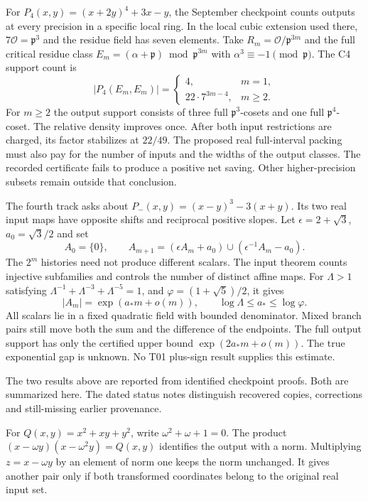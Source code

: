 For $P_4(x,y)=(x+2y)^4+3x-y$, the September checkpoint counts outputs at every precision in a specific local ring. In the local cubic extension used there, $7\mathcal O=\mathfrak p^3$ and the residue field has seven elements. Take $R_m=\mathcal O/\mathfrak p^{3m}$ and the full critical residue class $E_m=(\alpha+\mathfrak p)\bmod\mathfrak p^{3m}$ with $\alpha^3\equiv-1\pmod{\mathfrak p}$. The C4 support count is
\[
 |P_4(E_m,E_m)|=
 \begin{cases}
  4,&m=1,\\
  22\cdot7^{3m-4},&m\ge2.
 \end{cases}
\]
For $m\ge2$ the output support consists of three full $\mathfrak p^3$-cosets and one full $\mathfrak p^4$-coset. The relative density improves once. After both input restrictions are charged, its factor stabilizes at $22/49$. The proposed real full-interval packing must also pay for the number of inputs and the widths of the output classes. The recorded certificate fails to produce a positive net saving. Other higher-precision subsets remain outside that conclusion. 

The fourth track asks about $P_-(x,y)=(x-y)^3-3(x+y)$. Its two real input maps have opposite shifts and reciprocal positive slopes. Let $\epsilon=2+\sqrt3$, $a_0=\sqrt3/2$ and set
\[
 A_0=\{0\},\qquad
 A_{m+1}=(\epsilon A_m+a_0)\cup(\epsilon^{-1}A_m-a_0).
\]
The $2^m$ histories need not produce different scalars. The input theorem counts injective subfamilies and controls the number of distinct affine maps. For $\Lambda>1$ satisfying $\Lambda^{-1}+\Lambda^{-3}+\Lambda^{-5}=1$, and $\varphi=(1+\sqrt5)/2$, it gives
\[
 |A_m|=\exp(a_*m+o(m)),\qquad \log\Lambda\le a_*\le\log\varphi .
\]
All scalars lie in a fixed quadratic field with bounded denominator. Mixed branch pairs still move both the sum and the difference of the endpoints. The full output support has only the certified upper bound $\exp(2a_*m+o(m))$. The true exponential gap is unknown. No T01 plus-sign result supplies this estimate. 

\smallskip{} The two results above are reported from identified checkpoint proofs. Both are summarized here. The dated status notes distinguish recovered copies, corrections and still-missing earlier provenance.

For $Q(x,y)=x^2+xy+y^2$, write $\omega^2+\omega+1=0$. The product $(x-\omega y)(x-\omega^2y)=Q(x,y)$ identifies the output with a norm. Multiplying $z=x-\omega y$ by an element of norm one keeps the norm unchanged. It gives another pair only if both transformed coordinates belong to the original real input set.

